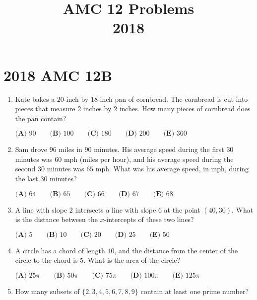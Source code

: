 \documentclass{article}
\title{AMC 12 Problems \\ 2018}
\date{}
\begin{document}
\maketitle\thispagestyle{fancy}\newpage\section*{2018 AMC 12B}
\begin{enumerate}[label=\arabic*., itemsep=0.5em]
\item Kate bakes a \(20\)-inch by \(18\)-inch pan of cornbread. The cornbread is cut into pieces that measure \(2\) inches by \(2\) inches. How many pieces of cornbread does the pan contain?

\(\textbf{(A) } 90 \qquad \textbf{(B) } 100 \qquad \textbf{(C) } 180 \qquad \textbf{(D) } 200 \qquad \textbf{(E) } 360\)\par \vspace{0.5em}\item Sam drove \(96\) miles in \(90\) minutes. His average speed during the first \(30\) minutes was \(60\) mph (miles per hour), and his average speed during the second \(30\) minutes was \(65\) mph. What was his average speed, in mph, during the last \(30\) minutes?

\(
\textbf{(A) } 64 \qquad
\textbf{(B) } 65 \qquad
\textbf{(C) } 66 \qquad
\textbf{(D) } 67 \qquad
\textbf{(E) } 68
\)\par \vspace{0.5em}\item A line with slope \(2\) intersects a line with slope \(6\) at the point \((40,30)\). What is the distance between the \(x\)-intercepts of these two lines? 

\(\textbf{(A) } 5 \qquad \textbf{(B) } 10 \qquad \textbf{(C) } 20 \qquad \textbf{(D) } 25 \qquad \textbf{(E) } 50\)\par \vspace{0.5em}\item A circle has a chord of length \(10\), and the distance from the center of the circle to the chord is \(5\). What is the area of the circle?

\(
\textbf{(A) }25\pi \qquad
\textbf{(B) }50\pi \qquad
\textbf{(C) }75\pi \qquad
\textbf{(D) }100\pi \qquad
\textbf{(E) }125\pi \qquad
\)\par \vspace{0.5em}\item How many subsets of \(\{2,3,4,5,6,7,8,9\}\) contain at least one prime number?


\end{enumerate}
\end{document}
